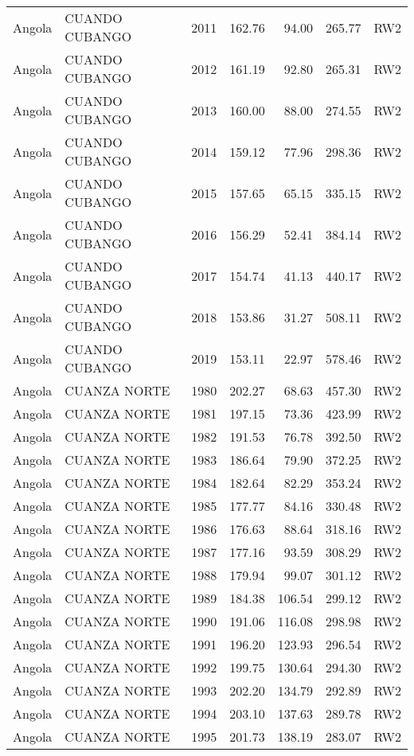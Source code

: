 \begin{longtable}{lllrrrl}
  Angola & CUANDO CUBANGO & 2011 & 162.76 & 94.00 & 265.77 & RW2 \\ 
  Angola & CUANDO CUBANGO & 2012 & 161.19 & 92.80 & 265.31 & RW2 \\ 
  Angola & CUANDO CUBANGO & 2013 & 160.00 & 88.00 & 274.55 & RW2 \\ 
  Angola & CUANDO CUBANGO & 2014 & 159.12 & 77.96 & 298.36 & RW2 \\ 
  Angola & CUANDO CUBANGO & 2015 & 157.65 & 65.15 & 335.15 & RW2 \\ 
  Angola & CUANDO CUBANGO & 2016 & 156.29 & 52.41 & 384.14 & RW2 \\ 
  Angola & CUANDO CUBANGO & 2017 & 154.74 & 41.13 & 440.17 & RW2 \\ 
  Angola & CUANDO CUBANGO & 2018 & 153.86 & 31.27 & 508.11 & RW2 \\ 
  Angola & CUANDO CUBANGO & 2019 & 153.11 & 22.97 & 578.46 & RW2 \\ 
  Angola & CUANZA NORTE & 1980 & 202.27 & 68.63 & 457.30 & RW2 \\ 
  Angola & CUANZA NORTE & 1981 & 197.15 & 73.36 & 423.99 & RW2 \\ 
  Angola & CUANZA NORTE & 1982 & 191.53 & 76.78 & 392.50 & RW2 \\ 
  Angola & CUANZA NORTE & 1983 & 186.64 & 79.90 & 372.25 & RW2 \\ 
  Angola & CUANZA NORTE & 1984 & 182.64 & 82.29 & 353.24 & RW2 \\ 
  Angola & CUANZA NORTE & 1985 & 177.77 & 84.16 & 330.48 & RW2 \\ 
  Angola & CUANZA NORTE & 1986 & 176.63 & 88.64 & 318.16 & RW2 \\ 
  Angola & CUANZA NORTE & 1987 & 177.16 & 93.59 & 308.29 & RW2 \\ 
  Angola & CUANZA NORTE & 1988 & 179.94 & 99.07 & 301.12 & RW2 \\ 
  Angola & CUANZA NORTE & 1989 & 184.38 & 106.54 & 299.12 & RW2 \\ 
  Angola & CUANZA NORTE & 1990 & 191.06 & 116.08 & 298.98 & RW2 \\ 
  Angola & CUANZA NORTE & 1991 & 196.20 & 123.93 & 296.54 & RW2 \\ 
  Angola & CUANZA NORTE & 1992 & 199.75 & 130.64 & 294.30 & RW2 \\ 
  Angola & CUANZA NORTE & 1993 & 202.20 & 134.79 & 292.89 & RW2 \\ 
  Angola & CUANZA NORTE & 1994 & 203.10 & 137.63 & 289.78 & RW2 \\ 
  Angola & CUANZA NORTE & 1995 & 201.73 & 138.19 & 283.07 & RW2 \\ 

\end{longtable}
